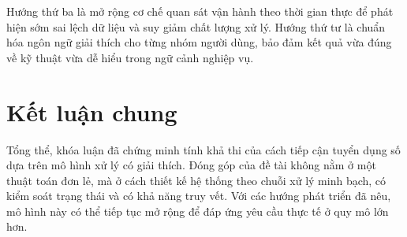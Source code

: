 Hướng thứ ba là mở rộng cơ chế quan sát vận hành theo thời gian thực để phát hiện sớm sai lệch dữ liệu và suy giảm chất lượng xử lý. Hướng thứ tư là chuẩn hóa ngôn ngữ giải thích cho từng nhóm người dùng, bảo đảm kết quả vừa đúng về kỹ thuật vừa dễ hiểu trong ngữ cảnh nghiệp vụ.

\section*{Kết luận chung}

Tổng thể, khóa luận đã chứng minh tính khả thi của cách tiếp cận tuyển dụng số dựa trên mô hình xử lý có giải thích. Đóng góp của đề tài không nằm ở một thuật toán đơn lẻ, mà ở cách thiết kế hệ thống theo chuỗi xử lý minh bạch, có kiểm soát trạng thái và có khả năng truy vết. Với các hướng phát triển đã nêu, mô hình này có thể tiếp tục mở rộng để đáp ứng yêu cầu thực tế ở quy mô lớn hơn.
